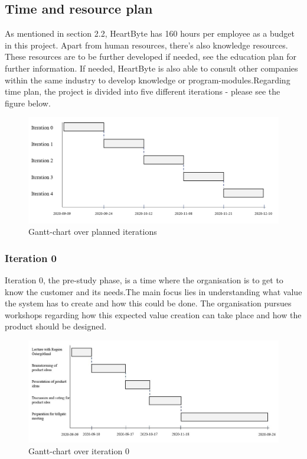 \subsection{Time and resource plan}
As mentioned in section 2.2, HeartByte has 160 hours per employee as a budget in this project. Apart from human resources, there's also knowledge resources. These resources are to be further developed if needed, see the education plan for further information. If needed, HeartByte is also able to consult other companies within the same industry to develop knowledge or program-modules.Regarding time plan, the project is divided into five different iterations - please see the figure below. 

\begin{figure}[H]
\centering
\includegraphics[width=\linewidth]{Pictures/all_iterations.jpeg}
\caption{Gantt-chart over planned iterations}
\label{fig:all_iterations}
\end{figure}
   
\subsubsection{Iteration 0}
Iteration 0, the pre-study phase, is a time where the organisation is to get to know the customer and its needs.The main focus lies in understanding what value the system has to create and how this could be done. The organisation pursues workshops regarding how this expected value creation can take place and how the product should be designed.

\begin{figure}[H]
\centering
\includegraphics[width=\linewidth]{Pictures/iteration_0.JPG}
\caption{Gantt-chart over iteration 0}
\label{fig:iteration_0}
\end{figure}

